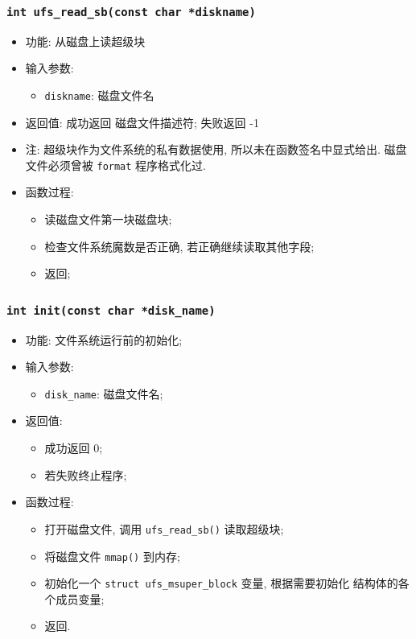 \documentclass[nofonts]{ctexart}
\begin{document}
\subsubsection[\texttt{ufs\_read\_sb}]{\texttt{int ufs\_read\_sb(const char *diskname)}}
\begin{itemize}
\item
  功能: 从磁盘上读超级块
\item
  输入参数:

  \begin{itemize}
  \item
    \texttt{diskname}: 磁盘文件名
  \end{itemize}
\item
  返回值: 成功返回 磁盘文件描述符; 失败返回 -1
\item
  注: 超级块作为文件系统的私有数据使用, 所以未在函数签名中显式给出.
  磁盘文件必须曾被 \texttt{format} 程序格式化过.
\item
  函数过程:

  \begin{itemize}
  \item
    读磁盘文件第一块磁盘块;
  \item
    检查文件系统魔数是否正确, 若正确继续读取其他字段;
  \item
    返回;
  \end{itemize}
\end{itemize}
\subsubsection[\texttt{init}]{\texttt{int init(const char *disk\_name)}}
        \begin{itemize}
\item
  功能: 文件系统运行前的初始化;
\item
  输入参数:

  \begin{itemize}
  \item
    \texttt{disk\_name}: 磁盘文件名;
  \end{itemize}
\item
  返回值:

  \begin{itemize}
  \item
    成功返回 0;
  \item
    若失败终止程序;
  \end{itemize}
\item
  函数过程:

  \begin{itemize}
  \item
    打开磁盘文件, 调用 \texttt{ufs\_read\_sb()} 读取超级块;
  \item
    将磁盘文件 \texttt{mmap()} 到内存;
  \item
    初始化一个 \texttt{struct ufs\_msuper\_block} 变量, 根据需要初始化
    结构体的各个成员变量;
  \item
    返回.
  \end{itemize}
  \end{itemize}
\end{document}
